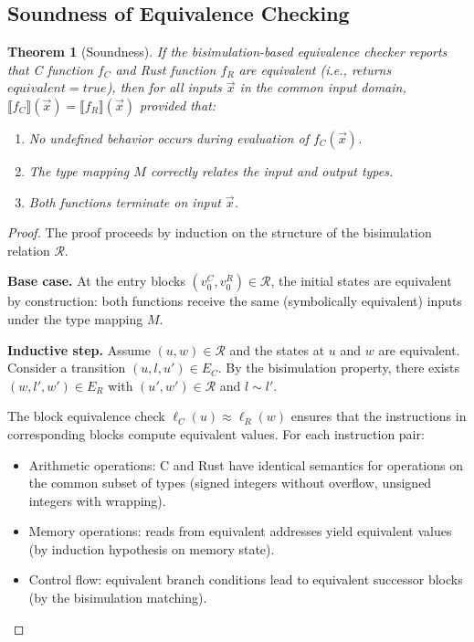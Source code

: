 \documentclass[11pt,a4paper]{article}
\newtheorem{theorem}{Theorem}
\begin{document}
\begin{appendices}
\subsection{Soundness of Equivalence Checking}

\begin{theorem}[Soundness]\label{thm:soundness}
If the bisimulation-based equivalence checker reports that C function
$f_C$ and Rust function $f_R$ are equivalent (i.e., returns
$\mathit{equivalent} = \mathit{true}$), then for all inputs $\vec{x}$
in the common input domain, $\llbracket f_C \rrbracket(\vec{x}) =
\llbracket f_R \rrbracket(\vec{x})$ provided that:
\begin{enumerate}
  \item No undefined behavior occurs during evaluation of $f_C(\vec{x})$.
  \item The type mapping $M$ correctly relates the input and output types.
  \item Both functions terminate on input $\vec{x}$.
\end{enumerate}
\end{theorem}

\begin{proof}
The proof proceeds by induction on the structure of the bisimulation
relation $\mathcal{R}$.

\textbf{Base case.} At the entry blocks $(v_0^C, v_0^R) \in \mathcal{R}$,
the initial states are equivalent by construction: both functions
receive the same (symbolically equivalent) inputs under the type
mapping $M$.

\textbf{Inductive step.} Assume $(u, w) \in \mathcal{R}$ and the states
at $u$ and $w$ are equivalent. Consider a transition
$(u, l, u') \in E_C$. By the bisimulation property, there exists
$(w, l', w') \in E_R$ with $(u', w') \in \mathcal{R}$ and $l \sim l'$.

The block equivalence check $\ell_C(u) \approx \ell_R(w)$ ensures that
the instructions in corresponding blocks compute equivalent values.
For each instruction pair:
\begin{itemize}
  \item Arithmetic operations: C and Rust have identical semantics for
    operations on the common subset of types (signed integers without
    overflow, unsigned integers with wrapping).
  \item Memory operations: reads from equivalent addresses yield
    equivalent values (by induction hypothesis on memory state).
  \item Control flow: equivalent branch conditions lead to equivalent
    successor blocks (by the bisimulation matching).
\end{itemize}


\end{proof}
\end{appendices}
\end{document}
